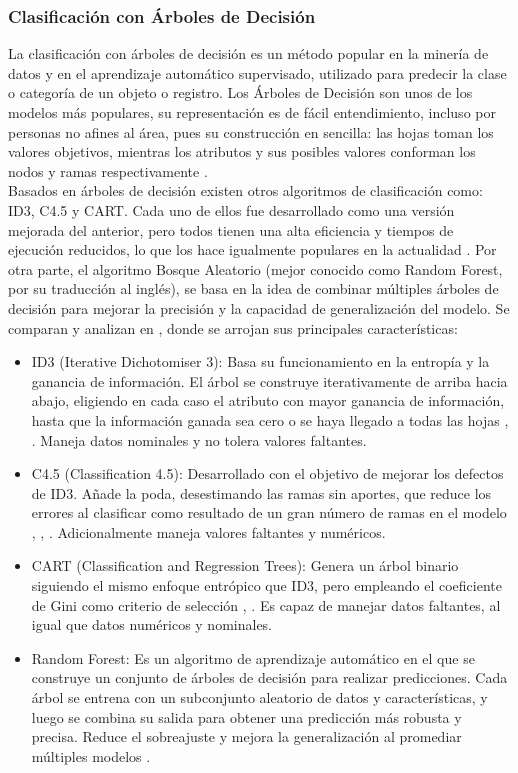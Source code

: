 \subsubsection{Clasificación con Árboles de Decisión}
La clasificación con árboles de decisión es un método popular en la minería de datos y en el aprendizaje automático supervisado, utilizado para predecir la clase o categoría de un objeto o registro. Los Árboles de Decisión son unos de los modelos más populares, su representación es de fácil entendimiento, incluso por personas no afines al área, pues su construcción en sencilla: las hojas toman los valores objetivos, mientras los atributos y sus posibles valores conforman los nodos y ramas respectivamente \citep{sammut2011encyclopedia}. \\
Basados en árboles de decisión existen otros algoritmos de clasificación como: ID3, C4.5 y CART. Cada uno de ellos fue desarrollado como una versión mejorada del anterior, pero todos tienen una alta eficiencia y tiempos de ejecución reducidos, lo que los hace igualmente populares en la actualidad \citep{javed2022performance}. Por otra parte, el algoritmo Bosque Aleatorio (mejor conocido como Random Forest, por su traducción al inglés), se basa en la idea de combinar múltiples árboles de decisión para mejorar la precisión y la capacidad de generalización del modelo. Se comparan y analizan en \citep{gupta2017analysis}, donde se arrojan sus principales características:
\begin{itemize}
	\item ID3 (Iterative Dichotomiser 3): Basa su funcionamiento en la entropía y la ganancia de información. El árbol se construye iterativamente de arriba hacia abajo, eligiendo en cada caso el atributo con mayor ganancia de información, hasta que la información ganada sea cero o se haya llegado a todas las hojas \citep{javed2022performance}, \citep{gupta2017analysis}. Maneja datos nominales y no tolera valores faltantes.
	\item C4.5 (Classification 4.5): Desarrollado con el objetivo de mejorar los defectos de ID3. Añade la poda, desestimando las ramas sin aportes, que reduce los errores al clasificar como resultado de un gran número de ramas en el modelo \citep{sammut2011encyclopedia}, \citep{javed2022performance}, \citep{gupta2017analysis}. Adicionalmente maneja valores faltantes y numéricos. 
	\item CART (Classification and Regression Trees): Genera un árbol binario siguiendo el mismo enfoque entrópico que ID3, pero empleando el coeficiente de Gini como criterio de selección \citep{javed2022performance}, \citep{gupta2017analysis}. Es capaz de manejar datos faltantes, al igual que datos numéricos y nominales.
	\item Random Forest: Es un algoritmo de aprendizaje automático en el que se construye un conjunto de árboles de decisión para realizar predicciones. Cada árbol se entrena con un subconjunto aleatorio de datos y características, y luego se combina su salida para obtener una predicción más robusta y precisa. Reduce el sobreajuste y mejora la generalización al promediar múltiples modelos \citep{gupta2017analysis}.
\end{itemize}

